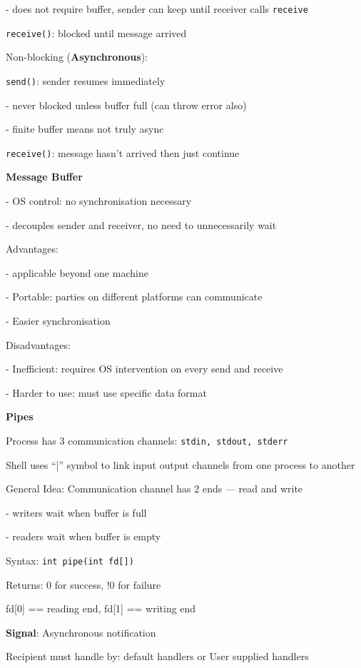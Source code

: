 \documentclass[10pt, a4paper]{article}
\newcommand{\blue}[1]{{\color{MidnightBlue}#1}}
\newcommand{\red}[1]{{\color{red}#1}}
\newcommand{\green}[1]{{\color{ForestGreen}#1}}
\newcommand{\tab}[0]{\hspace*{2mm}}
\begin{document}
\begin{multicols*}{3}
		\tab{} - does not require buffer, sender can keep until receiver calls \texttt{receive}

		\texttt{receive()}: blocked until message arrived

		Non-blocking (\textbf{Asynchronous}):

		\texttt{send()}: sender resumes immediately

		\tab{} - never blocked unless buffer full (can throw error also)

		\tab{} - finite buffer means not truly async

		\texttt{receive()}: message hasn't arrived then just continue

		\textbf{Message Buffer}

		- OS control: no synchronisation necessary

		- decouples sender and receiver, no need to unnecessarily wait

		\green{Advantages:}

		- applicable beyond one machine

		- Portable: parties on different platforms can communicate

		- Easier synchronisation

		\red{Disadvantages:}

		- Inefficient: requires OS intervention on every send and receive

		- Harder to use: must use specific data format

		\textbf{Pipes}

		Process has 3 communication channels: \texttt{stdin, stdout, stderr}

		Shell uses ``|'' symbol to link input output channels from one process to another

		General Idea: Communication channel has 2 ends --- read and write

		- writers \red{wait} when buffer is \red{full}

		- readers \red{wait} when buffer is \red{empty}

		Syntax: \texttt{int pipe(int fd[])}

		Returns: 0 for success, !0 for failure

		fd[0] == reading end, fd[1] == writing end

		\textbf{Signal}: Asynchronous notification

		Recipient must handle by: \blue{default handlers} or \blue{User supplied handlers}\\


\end{multicols*}
\end{document}
